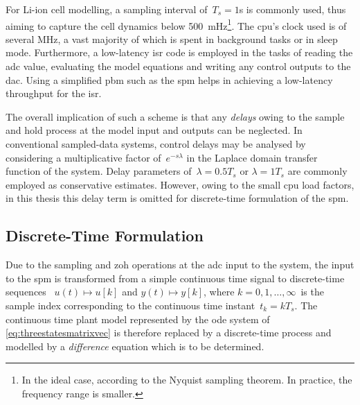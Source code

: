 For  Li-ion  cell  modelling,  a  sampling  interval  of~$T_s  =  1$\si{\second}
is   commonly  used,   thus  aiming   to   capture  the   cell  dynamics   below
\SI{500}{\milli\hertz}\footnote{In  the ideal  case,  according  to the  Nyquist
sampling theorem. In practice, the frequency range is smaller.}. The \gls{cpu}'s
clock  used is  of several  \si{\MHz},  a vast  majority  of which  is spent  in
background tasks or in sleep mode.  Furthermore, a low-latency \gls{isr} code is
employed  in the  tasks of  reading the  \gls{adc} value,  evaluating the  model
equations and writing  any control outputs to the \gls{dac}.  Using a simplified
\gls{pbm} such as the \gls{spm} helps  in achieving a low-latency throughput for
the \gls{isr}.

The overall implication of such a scheme  is that any \emph{delays} owing to the
sample and  hold process  at the model  input and outputs  can be  neglected. In
conventional sampled-data systems, control delays may be analysed by considering
a multiplicative factor of~$e^{-sλ}$ in the Laplace domain transfer function of
the system. Delay parameters of~${λ = 0.5  T_s}$ or ${λ = 1 T_s}$ are commonly
employed as conservative  estimates. However, owing to the  small \gls{cpu} load
factors, in this thesis this delay term is omitted for discrete-time formulation
of the \gls{spm}.

\subsection{Discrete-Time  Formulation}


Due  to the  sampling and  \gls{zoh} operations  at the  \gls{adc} input  to the
system,  the input  to the  \gls{spm} is  transformed from  a simple  continuous
time  signal to  discrete-time sequences  \ie~${u(t) \mapsto  u[k]}$ and  ${y(t)
\mapsto y[k]}$,  where ${k =  0,1,\dots,∞}$~is the sample  index corresponding
to  the  continuous time  instant~${t_k  =  kT_s}$.  The continuous  time  plant
model  represented by  the  \gls{ode}  system of  \cref{eq:threestatesmatrixvec}
is  therefore   replaced  by   a  discrete-time  process   and  modelled   by  a
\emph{difference} equation which is to be determined.

